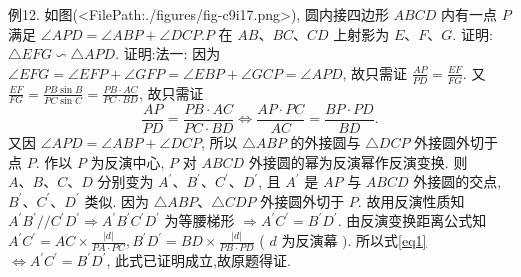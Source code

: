 例12. 如图(<FilePath:./figures/fig-c9i17.png>), 圆内接四边形 $A B C D$ 内有一点 $P$ 满足 $\angle A P D=\angle A B P+\angle D C P . P$ 在 $A B 、 B C 、 C D$ 上射影为 $E 、 F 、 G$. 证明: $\triangle E F G \backsim \triangle A P D$.
证明:法一: 因为 $\angle E F G=\angle E F P+\angle G F P= \angle E B P+\angle G C P=\angle A P D$, 故只需证 $\frac{A P}{P D}=\frac{E F}{F G}$. 又 $\frac{E F}{F G}=\frac{P B \sin B}{P C \sin C}=\frac{P B \cdot A C}{P C \cdot B D}$, 故只需证
$$
\frac{A P}{P D}=\frac{P B \cdot A C}{P C \cdot B D} \Leftrightarrow \frac{A P \cdot P C}{A C}=\frac{B P \cdot P D}{B D} . \label{eq1}
$$
又因 $\angle A P D=\angle A B P+\angle D C P$, 所以 $\triangle A B P$ 的外接圆与 $\triangle D C P$ 外接圆外切于点 $P$.
作以 $P$ 为反演中心, $P$ 对 $A B C D$ 外接圆的幂为反演幂作反演变换.
则 $A 、 B 、 C 、 D$ 分别变为 $A^{\prime} 、 B^{\prime} 、 C^{\prime} 、 D^{\prime}$, 且 $A^{\prime}$ 是 $A P$ 与 $A B C D$ 外接圆的交点, $B^{\prime} 、 C^{\prime} 、 D^{\prime}$ 类似.
因为 $\triangle A B P 、 \triangle C D P$ 外接圆外切于 $P$.
故用反演性质知 $A^{\prime} B^{\prime} / / C^{\prime} D^{\prime} \Rightarrow A^{\prime} B^{\prime} C^{\prime} D^{\prime}$ 为等腰梯形 $\Rightarrow A^{\prime} C^{\prime}=B^{\prime} D^{\prime}$.
由反演变换距离公式知
$A^{\prime} C^{\prime}=A C \times \frac{|d|}{P A \cdot P C}, B^{\prime} D^{\prime}=B D \times \frac{|d|}{P B \cdot P D}$ ( $d$ 为反演幕 $)$.
所以式\ref{eq1} $\Leftrightarrow A^{\prime} C^{\prime}=B^{\prime} D^{\prime}$, 此式已证明成立,故原题得证.



